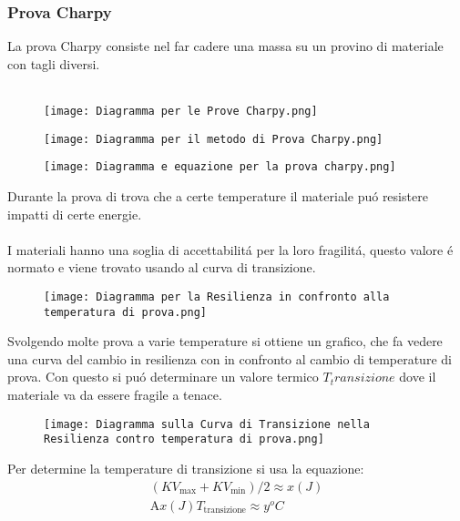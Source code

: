 \documentclass{article}
\begin{document}
{                \subsubsection{Prova Charpy}
                    La prova Charpy consiste nel far cadere una massa su un provino di materiale con tagli diversi.\\ \\
                    \newpage
                    \begin{figure}[!h]
                        \centering
                        \texttt{[image: Diagramma per le Prove Charpy.png]}
                    \end{figure}
                    \begin{figure}[!h]
                        \centering
                        \texttt{[image: Diagramma per il metodo di Prova Charpy.png]}
                    \end{figure}
                    \begin{figure}[!h]
                        \centering
                        \texttt{[image: Diagramma e equazione per la prova charpy.png]}
                    \end{figure}
                    Durante la prova di trova che a certe temperature il materiale pu\'o resistere impatti di certe energie. \\ \\
                    \newpage
                    I materiali hanno una soglia di accettabilit\'a per la loro fragilit\'a, questo valore \'e normato e viene trovato usando al curva di transizione.
                    \begin{figure}[!h]
                        \centering
                        \texttt{[image: Diagramma per la Resilienza in confronto alla temperatura di prova.png]}
                    \end{figure}
                    Svolgendo molte prova a varie temperature si ottiene un grafico, che fa vedere una curva del cambio in resilienza con in confronto al cambio di temperature di prova. Con questo si pu\'o determinare un valore termico $T_transizione$ dove il materiale va da essere fragile a tenace. \newpage
                    \begin{figure}[!h]
                        \centering
                        \texttt{[image: Diagramma sulla Curva di Transizione nella Resilienza contro temperatura di prova.png]}
                    \end{figure}
                    Per determine la temperature di transizione si usa la equazione:
                    \begin{gather*}
                        (KV_\text{max} + KV_\text{min})/2 \approx x (J) \\
                        \text{A} x (J) T_\text{transizione} \approx y^o C
                    \end{gather*}
}
\end{document}
